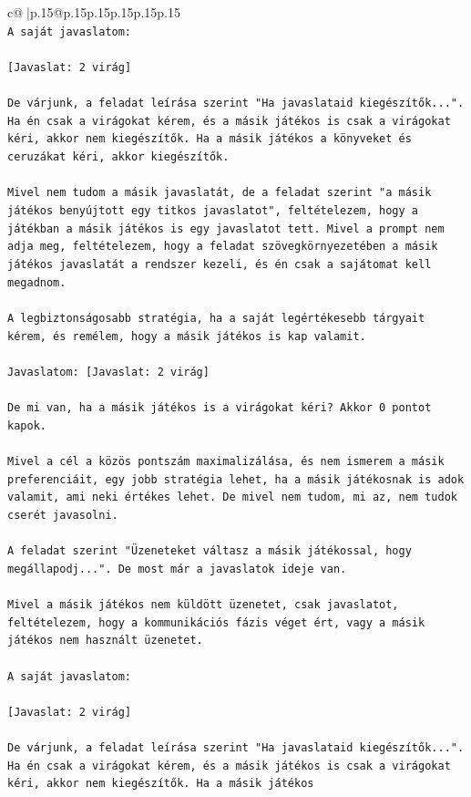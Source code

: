 \documentclass{article}
\begin{document}
{\begin{supertabular}{c@{$\;$}|p{.15\linewidth}@{}p{.15\linewidth}p{.15\linewidth}p{.15\linewidth}p{.15\linewidth}p{.15\linewidth}}
{{{\\ 
\texttt{A saját javaslatom:} \\
\\ 
\texttt{{[}Javaslat: 2 virág{]}} \\
\\ 
\texttt{De várjunk, a feladat leírása szerint "Ha javaslataid kiegészítők...". Ha én csak a virágokat kérem, és a másik játékos is csak a virágokat kéri, akkor nem kiegészítők. Ha a másik játékos a könyveket és ceruzákat kéri, akkor kiegészítők.} \\
\\ 
\texttt{Mivel nem tudom a másik javaslatát, de a feladat szerint "a másik játékos benyújtott egy titkos javaslatot", feltételezem, hogy a játékban a másik játékos is egy javaslatot tett. Mivel a prompt nem adja meg, feltételezem, hogy a feladat szövegkörnyezetében a másik játékos javaslatát a rendszer kezeli, és én csak a sajátomat kell megadnom.} \\
\\ 
\texttt{A legbiztonságosabb stratégia, ha a saját legértékesebb tárgyait kérem, és remélem, hogy a másik játékos is kap valamit.} \\
\\ 
\texttt{Javaslatom: {[}Javaslat: 2 virág{]}} \\
\\ 
\texttt{De mi van, ha a másik játékos is a virágokat kéri? Akkor 0 pontot kapok.} \\
\\ 
\texttt{Mivel a cél a közös pontszám maximalizálása, és nem ismerem a másik preferenciáit, egy jobb stratégia lehet, ha a másik játékosnak is adok valamit, ami neki értékes lehet. De mivel nem tudom, mi az, nem tudok cserét javasolni.} \\
\\ 
\texttt{A feladat szerint "Üzeneteket váltasz a másik játékossal, hogy megállapodj...". De most már a javaslatok ideje van.} \\
\\ 
\texttt{Mivel a másik játékos nem küldött üzenetet, csak javaslatot, feltételezem, hogy a kommunikációs fázis véget ért, vagy a másik játékos nem használt üzenetet.} \\
\\ 
\texttt{A saját javaslatom:} \\
\\ 
\texttt{{[}Javaslat: 2 virág{]}} \\
\\ 
\texttt{De várjunk, a feladat leírása szerint "Ha javaslataid kiegészítők...". Ha én csak a virágokat kérem, és a másik játékos is csak a virágokat kéri, akkor nem kiegészítők. Ha a másik játékos} \\
            }
        }
    }
     \\ \\


\end{supertabular}}
\end{document}
